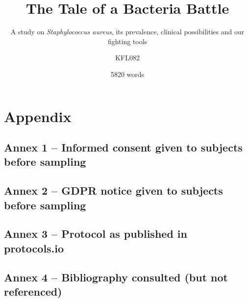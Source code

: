 \documentclass[fontsize=12pt,twoside=semi,openright,numbers=noenddot,parskip=half]{scrbook}
\title{The Tale of a Bacteria Battle}
\subtitle{A study on \emph{Staphylococcus aureus}, its prevalence, clinical possibilities and our fighting tools}
\author{KFL082}
\date{5820 words}
\begin{document}
\maketitle
\cleardoublepage
\renewcommand{\thepage}{\arabic{page}}
\frontmatter
\mainmatter\printindex\tableofcontents



%

\backmatter
\renewcommand{\thepage}{\Roman{page}}\setcounter{page}{0}
\clearpage
\printbibliography[title={Works referenced}]
\part{Appendix}\appendix
\chapter{Annex 1 – Informed consent given to subjects before sampling}

\clearpage\appendix\chapter{Annex 2 – GDPR notice given to subjects before sampling}

\chapter{Annex 3 – Protocol as published in protocols.io}

\chapter{Annex 4 – Bibliography consulted (but not referenced)}

\end{document}
